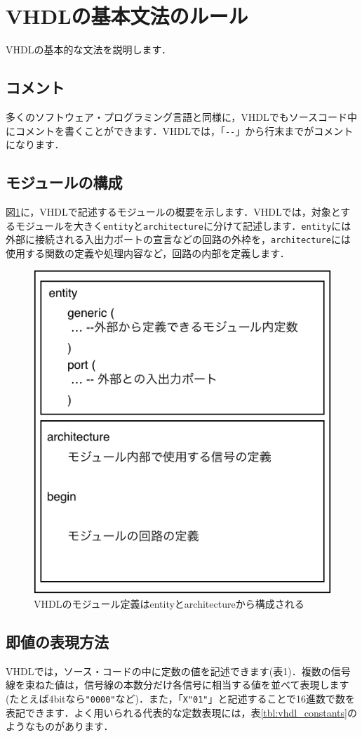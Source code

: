\documentclass[a4paper,dvipdfmx]{jsarticle}
\begin{document}
\section{VHDLの基本文法のルール}

VHDLの基本的な文法を説明します．

\subsection{コメント}
多くのソフトウェア・プログラミング言語と同様に，VHDLでもソースコード中にコメントを書くことができます．VHDLでは，「\verb|--|」から行末までがコメントになります．

\subsection{モジュールの構成}
図\ref{fig:vhdl_module_overview}に，VHDLで記述するモジュールの概要を示します．VHDLでは，対象とするモジュールを大きく\verb|entity|と\verb|architecture|に分けて記述します．\verb|entity|には外部に接続される入出力ポートの宣言などの回路の外枠を，\verb|architecture|には使用する関数の定義や処理内容など，回路の内部を定義します．

 \begin{figure}[H]
  \begin{center}
   \includegraphics[width=.4\textwidth]{chapter02_figures/vhdl_module_overview.png}
  \end{center}
  \caption{VHDLのモジュール定義はentityとarchitectureから構成される \label{fig:vhdl_module_overview}}
 \end{figure}

\subsection{即値の表現方法}
VHDLでは，ソース・コードの中に定数の値を記述できます(表1)．複数の信号線を束ねた値は，信号線の本数分だけ各信号に相当する値を並べて表現します(たとえば4bitなら\verb|"0000"|など)．また，「\verb|X"01"|」と記述することで16進数で数を表記できます．よく用いられる代表的な定数表現には，表\ref{tbl:vhdl_constants}のようなものがあります．
\end{document}

